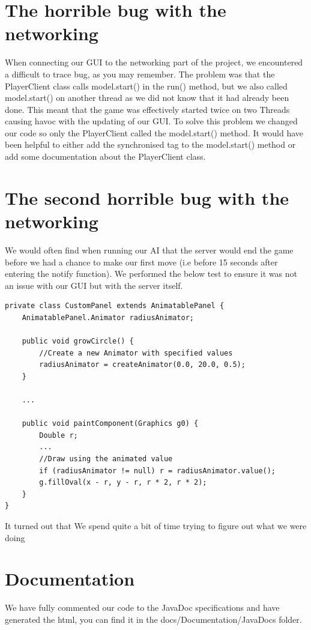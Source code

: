 \documentclass[a4paper, 12pt]{article}
\begin{document}
\section{The horrible bug with the networking}
When connecting our GUI to the networking part of the project, we encountered a difficult to trace bug, as you may remember. The problem was that the PlayerClient class calls model.start() in the run() method, but we also called model.start() on another thread as we did not know that it had already been done. This meant that the game was effectively started twice on two Threads causing havoc with the updating of our GUI. To solve this problem we changed our code so only the PlayerClient called the model.start() method. It would have been helpful to either add the synchronised tag to the model.start() method or add some documentation about the PlayerClient class.
\section{The second horrible bug with the networking}
We would often find when running our AI that the server would end the game before we had a chance to make our first move (i.e before 15 seconds after entering the notify function). We performed the below test to ensure it was not an issue with our GUI but with the server itself.
\begin{lstlisting}
private class CustomPanel extends AnimatablePanel {
	AnimatablePanel.Animator radiusAnimator;
	
	public void growCircle() {
		//Create a new Animator with specified values
		radiusAnimator = createAnimator(0.0, 20.0, 0.5);
	}
	
	...
	
	public void paintComponent(Graphics g0) {
		Double r;
		...
		//Draw using the animated value
		if (radiusAnimator != null) r = radiusAnimator.value();
		g.fillOval(x - r, y - r, r * 2, r * 2);
	}
}
\end{lstlisting}
It turned out that  We spend quite a bit of time trying to figure out what we were doing 
\section{Documentation}
We have fully commented our code to the JavaDoc specifications and have generated the html, you can find it in the docs/Documentation/JavaDocs folder.
\end{document}
